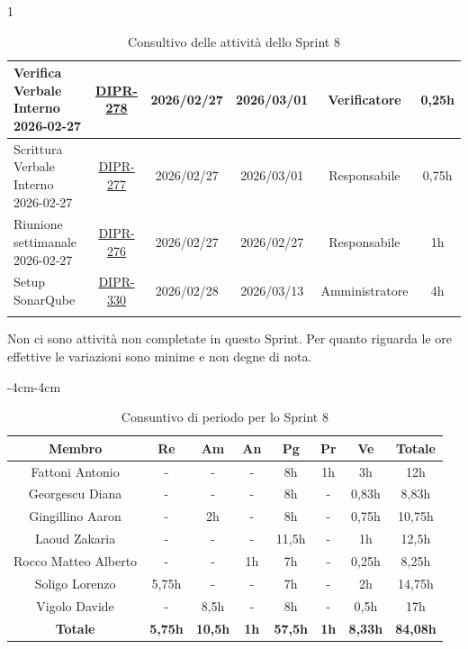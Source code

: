 \documentclass[a4paper,12pt]{article}
\begin{document}
\begin{spacing}{1}
\begin{longtable}{|p{4cm}|c|c|c|c|c|}
        \hline
        Verifica Verbale Interno 2026-02-27 & \href{https://7zpus.atlassian.net/browse/DIPR-278}{DIPR-278} & 2026/02/27 & 2026/03/01 & Verificatore & 0,25h \\
        \hline
        Scrittura Verbale Interno 2026-02-27 & \href{https://7zpus.atlassian.net/browse/DIPR-277}{DIPR-277} & 2026/02/27 & 2026/03/01 & Responsabile & 0,75h \\
        \hline
        Riunione settimanale 2026-02-27 & \href{https://7zpus.atlassian.net/browse/DIPR-276}{DIPR-276} & 2026/02/27 & 2026/02/27 & Responsabile & 1h \\
        \hline
        Setup SonarQube & \href{https://7zpus.atlassian.net/browse/DIPR-330}{DIPR-330} & 2026/02/28 & 2026/03/13 & Amministratore & 4h \\
        \hline
        \rowcolor{white}
        \caption{Consultivo delle attività dello Sprint 8}
    \end{longtable}
    \end{spacing}

Non ci sono attività non completate in questo Sprint. Per quanto riguarda le ore effettive le variazioni sono minime e non degne di nota.


\begin{table}[H]
    \begin{adjustwidth}{-4cm}{-4cm}
    \centering
    \begin{tabular}{|c|c|c|c|c|c|c|c|}
        \hline
        \textbf{Membro} & \textbf{Re} & \textbf{Am} & \textbf{An} & \textbf{Pg} & \textbf{Pr} & \textbf{Ve} & \textbf{Totale} \\
        \hline
        Fattoni Antonio & - & - & - & 8h & 1h & 3h & 12h \\
        \hline
        Georgescu Diana & - & - & - & 8h & - & 0,83h & 8,83h \\
        \hline
        Gingillino Aaron & - & 2h & - & 8h & - & 0,75h & 10,75h \\
        \hline
        Laoud Zakaria & - & - & - & 11,5h & - & 1h & 12,5h \\
        \hline
        Rocco Matteo Alberto & - & - & 1h & 7h & - & 0,25h & 8,25h \\
        \hline
        Soligo Lorenzo & 5,75h & - & - & 7h & - & 2h & 14,75h \\
        \hline
        Vigolo Davide & - & 8,5h & - & 8h & - & 0,5h & 17h \\
        \hline
        \textbf{Totale} & \textbf{5,75h} & \textbf{10,5h} & \textbf{1h} & \textbf{57,5h} & \textbf{1h} & \textbf{8,33h} & \textbf{84,08h} \\
        \hline
    \end{tabular}
    \caption{Consuntivo di periodo per lo Sprint 8}
    \end{adjustwidth}
\end{table}
\end{document}

